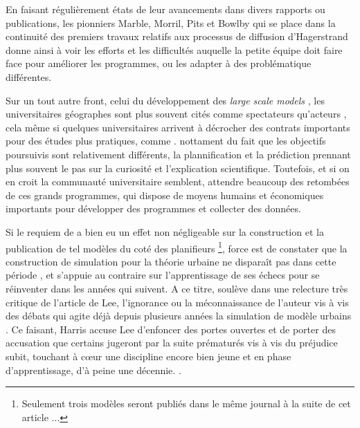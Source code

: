 En faisant régulièrement états de leur avancements dans divers rapports ou publications, les pionniers Marble, Morril, Pits et Bowlby \autocite{Pitts1963} qui se place dans la continuité des premiers travaux relatifs aux processus de diffusion d'Hagerstrand \autocite{Hagerstrand1953, Hagerstrand1967a} donne ainsi à voir les efforts et les difficultés auquelle la petite équipe doit faire face pour améliorer les programmes, ou les adapter à des problématique différentes.

Sur un tout autre front, celui du développement des \textit{large scale models} \autocites[8]{Batty1976}, les universitaires géographes sont plus souvent cités comme spectateurs qu'acteurs \autocite[9]{Batty1994}, cela même si quelques universitaires arrivent à décrocher des contrats importants \autocite{Barnes2006a} pour des études plus pratiques, comme \textcite{Garrison1959}. nottament du fait que les objectifs poursuivis sont relativement différents, la plannification et la prédiction prennant plus souvent le pas sur la curiosité et l'explication scientifique. Toutefois, et si on en croit \textcite{Haggett1969} la communauté universitaire semblent, attendre beaucoup des retombées de ces grands programmes, qui dispose de moyens humains et économiques importants pour développer des programmes et collecter des données.

Si le requiem de \textcite{Lee1973} a bien eu un effet non négligeable sur la construction et la publication de tel modèles du coté des planifieurs \footnote{Seulement trois modèles seront publiés dans le même journal à la suite de cet article ...}, force est de constater que la construction de simulation pour la théorie urbaine ne disparaît pas dans cette période \autocite[11-12]{Batty1994}, et s'appuie au contraire sur l'apprentissage de ses échecs pour se réinventer dans les années qui suivent. A ce titre, \textcite{Harris1994} soulève dans une relecture très critique de l'article de Lee, l'ignorance ou la méconnaissance de l'auteur vis à vis des débats qui agite déjà depuis plusieurs années la simulation de modèle urbains \autocite{Batty1971, Wilson1970, Orcutt1957, Harris1968}. Ce faisant, Harris accuse Lee d'enfoncer des portes ouvertes et de porter des accusation que certains jugeront par la suite prématurés vis à vis du préjudice subit, touchant à cœur une discipline encore bien jeune et en phase d'apprentissage, d'à peine une décennie. \autocite[p11]{Batty1994}.

